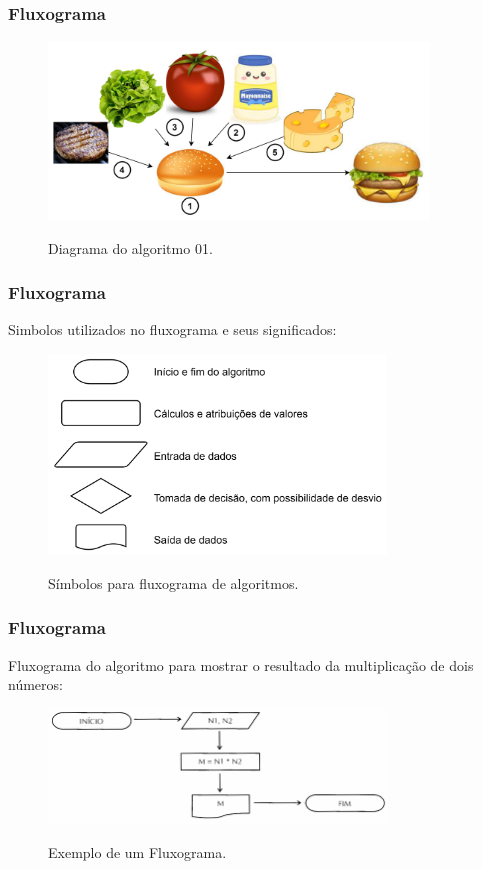 \begin{frame}
	\frametitle{Fluxograma}
	\begin{figure}
		\centering
		\includegraphics[width=0.9\textwidth]{../../figuras/algoritmo-hamburger-1.png}\\[-2ex]
		\caption{Diagrama do algoritmo 01.}
		\label{fig:Diagrama}
	\end{figure}
\end{frame}



\begin{frame}
	\frametitle{Fluxograma}
	Simbolos utilizados no fluxograma e seus significados:
	\begin{figure}
		\centering
		\includegraphics[width=0.8\textwidth]{../../figuras/simbolos-fluxograma.png}\\[-2ex]
		\caption{Símbolos para fluxograma de algoritmos.}
		\label{fig:Diagrama}
	\end{figure}
\end{frame}


\begin{frame}
	\frametitle{Fluxograma}
	Fluxograma do algoritmo para mostrar o resultado da multiplicação de dois números:
	\begin{figure}
		\centering
		\includegraphics[width=0.8\textwidth]{../../figuras/exemplo-fluxograma.png}\\[-2ex]
		\caption{Exemplo de um Fluxograma.}
		\label{fig:exemplo-Fluxograma}
	\end{figure}
\end{frame}



